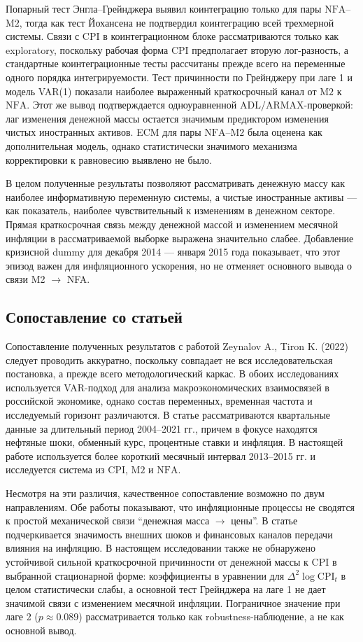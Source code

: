 \documentclass[12pt,a4paper]{article}
\begin{document}
Попарный тест Энгла--Грейнджера выявил коинтеграцию только для пары $\mathrm{NFA}$--$\mathrm{M2}$, тогда как
тест Йохансена не подтвердил коинтеграцию всей трехмерной системы. Связи с CPI в
коинтеграционном блоке рассматриваются только как exploratory, поскольку рабочая форма CPI
предполагает вторую лог-разность, а стандартные коинтеграционные тесты рассчитаны прежде
всего на переменные одного порядка интегрируемости. Тест причинности по Грейнджеру при лаге
1 и модель VAR(1) показали наиболее выраженный краткосрочный канал от $\mathrm{M2}$ к $\mathrm{NFA}$.
Этот же вывод подтверждается одноуравненной ADL/ARMAX-проверкой: лаг изменения денежной
массы остается значимым предиктором изменения чистых иностранных активов. ECM для пары
$\mathrm{NFA}$--$\mathrm{M2}$ была оценена как дополнительная модель, однако статистически значимого механизма
корректировки к равновесию выявлено не было.

В целом полученные результаты позволяют рассматривать денежную массу как наиболее
информативную переменную системы, а чистые иностранные активы --- как показатель, наиболее
чувствительный к изменениям в денежном секторе. Прямая краткосрочная связь между денежной
массой и изменением месячной инфляции в рассматриваемой выборке выражена значительно слабее.
Добавление кризисной dummy для декабря 2014 --- января 2015 года показывает, что этот эпизод
важен для инфляционного ускорения, но не отменяет основного вывода о связи M2 $\to$ NFA.

\subsection{Сопоставление со статьей}
Сопоставление полученных результатов с работой Zeynalov A., Tiron K. (2022) следует
проводить аккуратно, поскольку совпадает не вся исследовательская постановка, а прежде всего
методологический каркас. В обоих исследованиях используется VAR-подход для анализа
макроэкономических взаимосвязей в российской экономике, однако состав переменных, временная
частота и исследуемый горизонт различаются. В статье рассматриваются квартальные данные за
длительный период 2004--2021 гг., причем в фокусе находятся нефтяные шоки, обменный курс,
процентные ставки и инфляция. В настоящей работе используется более короткий месячный
интервал 2013--2015 гг. и исследуется система из $\mathrm{CPI}$, $\mathrm{M2}$ и $\mathrm{NFA}$.

Несмотря на эти различия, качественное сопоставление возможно по двум направлениям.
Обе работы показывают, что инфляционные процессы не сводятся к простой
механической связи ``денежная масса $\to$ цены''. В статье подчеркивается значимость внешних
шоков и финансовых каналов передачи влияния на инфляцию. В настоящем исследовании также не
обнаружено устойчивой сильной краткосрочной причинности от денежной массы к CPI в выбранной
стационарной форме: коэффициенты в уравнении для $\Delta^2 \log \mathrm{CPI}_t$ в целом
статистически слабы, а основной тест Грейнджера на лаге 1 не дает значимой связи с изменением
месячной инфляции. Пограничное значение при лаге 2 ($p \approx 0.089$) рассматривается только
как robustness-наблюдение, а не как основной вывод.
\end{document}
